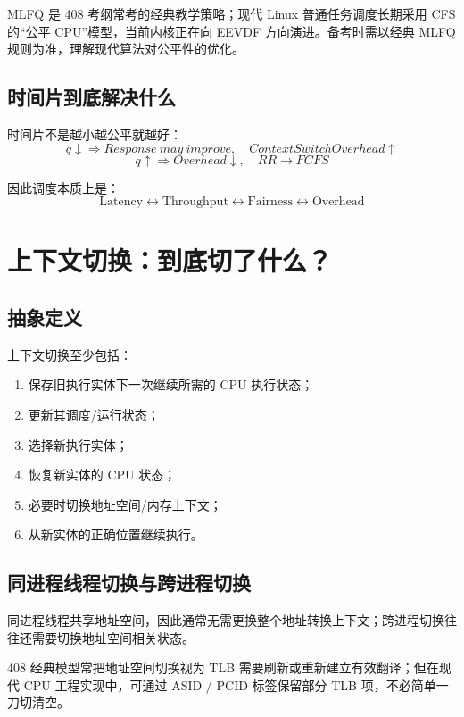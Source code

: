 \documentclass[11pt,a4paper]{ctexart}
\begin{document}
\begin{warn}
MLFQ 是 408 考纲常考的经典教学策略；现代 Linux 普通任务调度长期采用 CFS 的“公平 CPU”模型，当前内核正在向 EEVDF 方向演进。备考时需以经典 MLFQ 规则为准，理解现代算法对公平性的优化。
\end{warn}

\subsection{时间片到底解决什么}

时间片不是越小越公平就越好：
\[
q\downarrow\Rightarrow Response\ may\ improve,
\quad ContextSwitchOverhead\uparrow
\]
\[
q\uparrow\Rightarrow Overhead\downarrow,
\quad RR\rightarrow FCFS
\]

因此调度本质上是：
\[
\boxed{\text{Latency}\leftrightarrow\text{Throughput}\leftrightarrow\text{Fairness}\leftrightarrow\text{Overhead}}
\]

\section{上下文切换：到底切了什么？}

\subsection{抽象定义}

上下文切换至少包括：
\begin{enumerate}
\item 保存旧执行实体下一次继续所需的 CPU 执行状态；
\item 更新其调度/运行状态；
\item 选择新执行实体；
\item 恢复新实体的 CPU 状态；
\item 必要时切换地址空间/内存上下文；
\item 从新实体的正确位置继续执行。
\end{enumerate}

\subsection{同进程线程切换与跨进程切换}

同进程线程共享地址空间，因此通常无需更换整个地址转换上下文；跨进程切换往往还需要切换地址空间相关状态。

\begin{warn}
408 经典模型常把地址空间切换视为 TLB 需要刷新或重新建立有效翻译；但在现代 CPU 工程实现中，可通过 ASID / PCID 标签保留部分 TLB 项，不必简单一刀切清空。
\end{warn}
\end{document}
